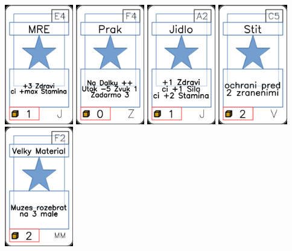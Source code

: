 \documentclass[a4paper]{article}
\begin{document}
	\includegraphics[width=3.0cm]{img-1_23}
	\includegraphics[width=3.0cm]{img-1_88}
	\includegraphics[width=3.0cm]{img-1_1}
	\includegraphics[width=3.0cm]{img-1_74}
	\includegraphics[width=3.0cm]{img-1_56}
\end{document}
